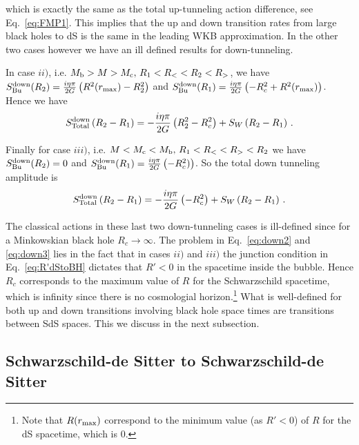 \documentclass[a4paper,11pt]{article}
\numberwithin{equation}{section}
\newcommand{\be}{\begin{equation}}
\newcommand{\ee}{\end{equation}}
\numberwithin{equation}{section}
\begin{document}
which is exactly the same as the total up-tunneling action
difference, see Eq.~\eqref{eq:FMP1}. This implies that the up and down transition rates from large black holes to dS is the same in the leading WKB approximation. In the other two cases
however we have an ill defined results for down-tunneling.

In case $ii)$, i.e. $M_{{\rm b}}>M>M_{{\rm c}},\,R_{1}<R_{<}<R_{2}<R_{>}$, we have $S_{{\rm Bu}}^{{\rm down}}(R_{2})=\frac{i\eta\pi}{2G}\left(R^{2}(r_{\rm max})-R_{2}^{2}\right)$
and $S_{{\rm Bu}}^{{\rm down}}(R_{1})=\frac{i\eta\pi}{2G}\left(-R^{2}_c+R^{2}(r_{\rm max})\right)$.
Hence we have 
\be
\label{eq:down2}
S_{{\rm Total}}^{{\rm down}}\left(R_{2}-R_{1}\right)=-\frac{i\eta\pi}{2G}\left(R_{2}^{2}-R^{2}_c\right)+S_{W}\left(R_{2}-R_{1}\right) \,.
\ee

Finally for case $iii)$, i.e. $M<M_{{\rm c}}<M_{{\rm b}},\,R_{1}<R_{<}<R_{>}<R_{2}$ we have
$S_{{\rm Bu}}^{{\rm down}}(R_{2})=0$ and $S_{{\rm Bu}}^{{\rm down}}(R_{1})=\frac{i\eta\pi}{2G}\left(-R^{2}_c)\right)$.
So the total down tunneling amplitude is
\be
\label{eq:down3}
S_{{\rm Total}}^{{\rm down}}\left(R_{2}-R_{1}\right)=-\frac{i\eta\pi}{2G}\left(-R^{2}_c\right)+S_{W}\left(R_{2}-R_{1}\right) \,.
\ee

The classical actions in these last two down-tunneling cases is ill-defined since for a Minkowskian black hole $R_c\rightarrow \infty$. The problem in Eq.~\eqref{eq:down2} and \eqref{eq:down3} lies in the fact that in cases $ii)$ and $iii)$ the junction condition in Eq.~\eqref{eq:R'dStoBH} dictates that $R' < 0$ in the spacetime inside the bubble. Hence $R_c$ corresponds to the maximum value of $R$ for the Schwarzschild spacetime, which is infinity since there is no cosmologial horizon.\footnote{Note that $R(r_{\rm max})$ correspond to the minimum value (as $R' < 0$) of $R$ for the dS spacetime,
which is $0$.} What is well-defined for both up and down transitions involving black hole space times are transitions between SdS spaces. This we discuss in the next subsection.


\subsection{Schwarzschild-de Sitter to Schwarzschild-de Sitter\label{sec:sdstosds}}
\end{document}
